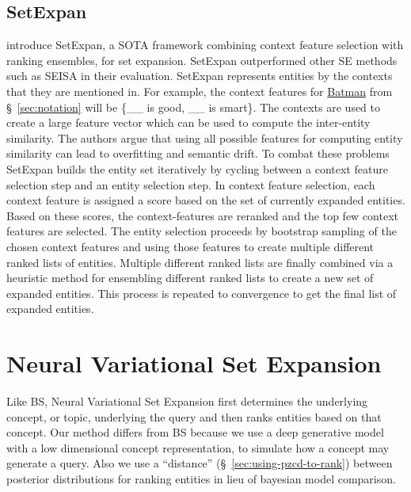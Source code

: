 \documentclass[a4paper]{article}
\newcommand{\secref}[1]{\S~\ref{#1}}
\newcommand{\setX}{SetExpan\xspace}
\newcommand{\nvgeLong}{Neural Variational Set Expansion\xspace}
\newcommand{\mynewcite}[1]{\cite{#1}}%
\begin{document}
\subsection{SetExpan}
\mynewcite{shen2017setexpan} introduce \setX, a SOTA framework combining context feature selection with %
ranking ensembles, for set expansion. \setX outperformed other SE methods such as SEISA in their evaluation. \setX represents entities by the contexts
that they are mentioned in. For example, the context features for \underline{Batman} from \secref{sec:notation} will be \{\_\_ is good, \_\_ is smart\}. The contexts are used to create a large feature vector which can be used to compute the inter-entity similarity. The authors argue that using all possible features for computing entity similarity can lead to overfitting and semantic drift. To combat these problems \setX builds the entity set iteratively by cycling between a context feature selection step and an entity selection step. In context feature selection, each context feature is assigned a score based on the set of currently expanded entities. Based on these scores, the context-features are reranked and the top few context features are selected. The entity selection proceeds by bootstrap sampling of the chosen context features and using those features to create multiple different ranked lists of entities. Multiple different ranked lists are finally combined via a heuristic method for ensembling different ranked lists to create a new set of expanded entities. This process is repeated to convergence to get the final list of expanded entities.

\section{\nvgeLong} %
Like BS, \nvgeLong first determines the underlying concept, or topic, underlying the query
and then ranks entities based on that concept. %
Our method differs from BS
because we  use a deep generative model with a low dimensional concept representation, to simulate how a concept may generate a query. Also we use a ``distance'' (\S~\ref{sec:using-pzcd-to-rank}) between posterior distributions for ranking entities in lieu of bayesian model comparison.
\end{document}

